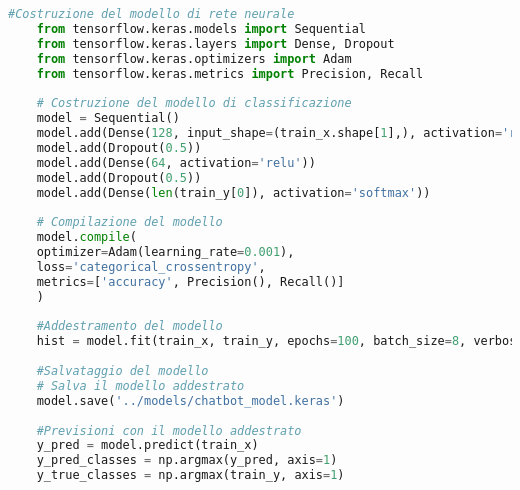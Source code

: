 \begin{lstlisting}[language=Python, caption=Utilizzo di TensorFlow e Keras nel codice]
	#Costruzione del modello di rete neurale
	from tensorflow.keras.models import Sequential
	from tensorflow.keras.layers import Dense, Dropout
	from tensorflow.keras.optimizers import Adam
	from tensorflow.keras.metrics import Precision, Recall
	
	# Costruzione del modello di classificazione
	model = Sequential()
	model.add(Dense(128, input_shape=(train_x.shape[1],), activation='relu'))
	model.add(Dropout(0.5))
	model.add(Dense(64, activation='relu'))
	model.add(Dropout(0.5))
	model.add(Dense(len(train_y[0]), activation='softmax'))
	
	# Compilazione del modello
	model.compile(
	optimizer=Adam(learning_rate=0.001),
	loss='categorical_crossentropy',
	metrics=['accuracy', Precision(), Recall()]
	)
	
	#Addestramento del modello 
	hist = model.fit(train_x, train_y, epochs=100, batch_size=8, verbose=1)
	
	#Salvataggio del modello
	# Salva il modello addestrato
	model.save('../models/chatbot_model.keras')
	
	#Previsioni con il modello addestrato
	y_pred = model.predict(train_x)
	y_pred_classes = np.argmax(y_pred, axis=1)
	y_true_classes = np.argmax(train_y, axis=1)
\end{lstlisting}